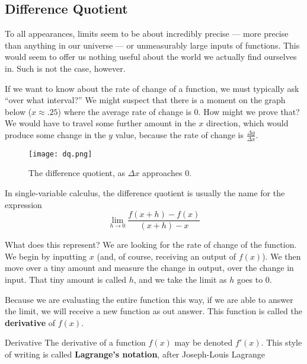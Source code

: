 
\subsection{Difference Quotient}




To all appearances, limits seem to be about incredibly precise --- more precise
than anything in our universe --- or unmeasurably large inputs of functions.
This would seem to offer us nothing useful about the world we actually find ourselves
in.  Such is not the case, however.

If we want to know about the rate of change of a function, we must typically ask 
``over what interval?''  We might suspect that there is a moment on the graph below
($x\approx.25$) where the average rate of change is 0.  How might we prove that?
We would have to travel some further amount in the $x$ direction, which would
produce some change in the $y$ value, because the rate of change is $\frac{\Delta y}
{\Delta x}$.

\begin{figure}
\begin{center}
\texttt{[image: dq.png]}
\caption{The difference quotient, as $\Delta x$ approaches 0\cite{tikzdq}.}
\end{center}
\end{figure}

In single-variable calculus, the difference quotient is usually the name for the expression
\begin{equation}
\lim_{h\rightarrow0}\frac {f(x+h)-f(x)}{(x+h)-x}
\end{equation}

What does this represent?  We are looking for the rate of change of the function.  We begin
by inputting $x$ (and, of course, receiving an output of $f(x)$).  We then move over a tiny 
amount and measure the change in output, over the change in input.  That tiny amount is called
$h$, and we take the limit as $h$ goes to 0.

Because we are evaluating the entire function this way, if we are able to answer the limit, 
we will receive a new function as out answer.  This function is called the \textbf{derivative} of
$f(x)$.


\begin{derivation}{Derivative}
The derivative of a function $f(x)$ may be denoted $f'(x)$.  This style of writing is
called \textbf{Lagrange's notation}, after Joseph-Louis Lagrange
\end{derivation}


